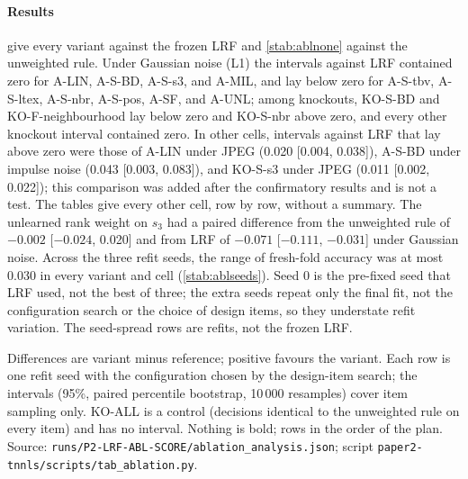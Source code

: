 \documentclass[journal,onecolumn]{IEEEtran}
\theoremstyle{plain}
\begin{document}
\paragraph*{Results}
 give every variant against the frozen LRF and \cref{stab:ablnone} against the unweighted rule.
Under Gaussian noise (L1) the intervals against LRF contained zero for A-LIN, A-S-BD, A-S-s3, and A-MIL, and lay below zero for A-S-tbv,
A-S-ltex, A-S-nbr, A-S-pos, A-SF, and A-UNL; among knockouts, KO-S-BD and KO-F-neighbourhood lay below zero and KO-S-nbr above zero, and
every other knockout interval contained zero.
In other cells, intervals against LRF that lay above zero were those of A-LIN under JPEG (0.020 [0.004, 0.038]), A-S-BD under impulse noise
(0.043 [0.003, 0.083]), and KO-S-s3 under JPEG (0.011 [0.002, 0.022]); this comparison was added after the confirmatory results and is not a
test. The tables give every other cell, row by row, without a summary.
The unlearned rank weight on $s_3$ had a paired difference from the unweighted rule of $-0.002$ [$-0.024$, 0.020] and from LRF of $-0.071$
[$-0.111$, $-0.031$] under Gaussian noise.
Across the three refit seeds, the range of fresh-fold accuracy was at most 0.030 in every variant and cell (\cref{stab:ablseeds}).
Seed 0 is the pre-fixed seed that LRF used, not the best of three; the extra seeds repeat only the final fit, not the configuration search
or the choice of design items, so they understate refit variation. The seed-spread rows are refits, not the frozen LRF.

\begin{table}[!htbp]
\centering
\caption{Exploratory Ablation (Added After the Confirmatory Results): Accuracy and Difference From the Frozen LRF, L1 Cells}
\label{stab:ablL1}
\scriptsize
\setlength{\tabcolsep}{3pt}
\resizebox{\textwidth}{!}{}

\vspace{2pt}
\parbox{\textwidth}{\scriptsize Differences are variant minus reference; positive favours the variant. Each row is one refit seed with the
configuration chosen by the design-item search; the intervals (95\%, paired percentile bootstrap, 10\,000 resamples) cover item
sampling only. KO-ALL is a control (decisions identical to the unweighted rule on every item) and has no interval. Nothing is bold; rows in
the order of the plan. Source: \nolinkurl{runs/P2-LRF-ABL-SCORE/ablation_analysis.json}; script
\nolinkurl{paper2-tnnls/scripts/tab_ablation.py}.}
\end{table}
\end{document}
